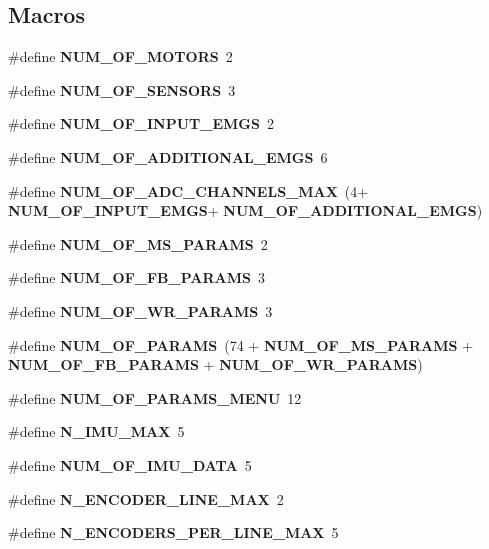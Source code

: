 \subsection*{Macros}
\begin{DoxyCompactItemize}
\item 
\#define \textbf{ N\+U\+M\+\_\+\+O\+F\+\_\+\+M\+O\+T\+O\+RS}~2
\item 
\#define \textbf{ N\+U\+M\+\_\+\+O\+F\+\_\+\+S\+E\+N\+S\+O\+RS}~3
\item 
\#define \textbf{ N\+U\+M\+\_\+\+O\+F\+\_\+\+I\+N\+P\+U\+T\+\_\+\+E\+M\+GS}~2
\item 
\#define \textbf{ N\+U\+M\+\_\+\+O\+F\+\_\+\+A\+D\+D\+I\+T\+I\+O\+N\+A\+L\+\_\+\+E\+M\+GS}~6
\item 
\mbox{\label{globals_8h_a94a49570e3bc73b67084f1a9ae90d89a}} 
\#define {\bfseries N\+U\+M\+\_\+\+O\+F\+\_\+\+A\+D\+C\+\_\+\+C\+H\+A\+N\+N\+E\+L\+S\+\_\+\+M\+AX}~(4+\textbf{ N\+U\+M\+\_\+\+O\+F\+\_\+\+I\+N\+P\+U\+T\+\_\+\+E\+M\+GS}+\textbf{ N\+U\+M\+\_\+\+O\+F\+\_\+\+A\+D\+D\+I\+T\+I\+O\+N\+A\+L\+\_\+\+E\+M\+GS})
\item 
\#define \textbf{ N\+U\+M\+\_\+\+O\+F\+\_\+\+M\+S\+\_\+\+P\+A\+R\+A\+MS}~2
\item 
\#define \textbf{ N\+U\+M\+\_\+\+O\+F\+\_\+\+F\+B\+\_\+\+P\+A\+R\+A\+MS}~3
\item 
\#define \textbf{ N\+U\+M\+\_\+\+O\+F\+\_\+\+W\+R\+\_\+\+P\+A\+R\+A\+MS}~3
\item 
\#define \textbf{ N\+U\+M\+\_\+\+O\+F\+\_\+\+P\+A\+R\+A\+MS}~(74 + \textbf{ N\+U\+M\+\_\+\+O\+F\+\_\+\+M\+S\+\_\+\+P\+A\+R\+A\+MS} + \textbf{ N\+U\+M\+\_\+\+O\+F\+\_\+\+F\+B\+\_\+\+P\+A\+R\+A\+MS} + \textbf{ N\+U\+M\+\_\+\+O\+F\+\_\+\+W\+R\+\_\+\+P\+A\+R\+A\+MS})
\item 
\#define \textbf{ N\+U\+M\+\_\+\+O\+F\+\_\+\+P\+A\+R\+A\+M\+S\+\_\+\+M\+E\+NU}~12
\item 
\mbox{\label{globals_8h_a8e4d7a571850d3268c9b780b171474e6}} 
\#define {\bfseries N\+\_\+\+I\+M\+U\+\_\+\+M\+AX}~5
\item 
\mbox{\label{globals_8h_a7016adad486a9166338f1667813d8b5c}} 
\#define {\bfseries N\+U\+M\+\_\+\+O\+F\+\_\+\+I\+M\+U\+\_\+\+D\+A\+TA}~5
\item 
\#define \textbf{ N\+\_\+\+E\+N\+C\+O\+D\+E\+R\+\_\+\+L\+I\+N\+E\+\_\+\+M\+AX}~2
\item 
\#define \textbf{ N\+\_\+\+E\+N\+C\+O\+D\+E\+R\+S\+\_\+\+P\+E\+R\+\_\+\+L\+I\+N\+E\+\_\+\+M\+AX}~5
\item 
\mbox{\label{globals_8h_a3b87e4129f51a9ee36bdfb06ea0a9268}} 

\end{DoxyCompactItemize}
